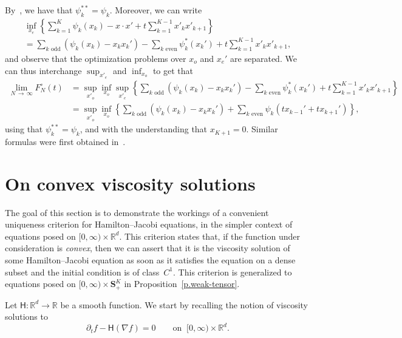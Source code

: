 \documentclass[AHL,Unicode,longabstracts,published]{cedram}
\newcommand{\R}{\mathbb{R}}
\renewcommand{\S}{\mathbf{S}}
\newcommand{\Ll}{\left}
\newcommand{\Rr}{\right}
\newcommand{\dr}{\partial}
\newcommand{\msf}{\mathsf}
\begin{document}
By~\cite[Theorem~12.4]{rockafellar1970convex}, we have that $\psi_k^{**} = \psi_k$. Moreover, we can write
\begin{multline*}
\inf_{x_e} \Ll\{ \sum_{k = 1}^K \psi_k(x_k) - x \cdot x' + t \sum_{k = 1}^{K-1} x'_k x'_{k+1}\Rr\} \\
= \sum_{k \text{ odd}} \Ll(\psi_k(x_k) -x_k x_k'\Rr) - \sum_{k \text{ even}} \psi^*_k(x_k') + t \sum_{k = 1}^{K-1} x'_k x'_{k+1},
\end{multline*}
and observe that the optimization problems over $x_o$ and $x_e'$ are separated. We can thus interchange $\sup_{x'_e}$ and $\inf_{x_o}$ to get that
\begin{align*}
\lim_{N\,\to\,\infty} F_N^\circ(t) & = \sup_{x'_o} \inf_{x_o} \sup_{x'_e} \Ll\{ \sum_{k \text{ odd}} \Ll(\psi_k(x_k) -x_k x_k'\Rr) - \sum_{k \text{ even}} \psi_k^*\Ll(x_k'\Rr) + t \sum_{k = 1}^{K-1} x'_k x'_{k+1} \Rr\}
\\
& = \sup_{x'_o} \inf_{x_o} \Ll\{\sum_{k \text{ odd}} \Ll(\psi_k(x_k)- x_k x_k'\Rr) + \sum_{k \text{ even}} \psi_k\Ll(t x_{k-1}' + t x_{k+1}'\Rr)\Rr\},
\end{align*}
using that $\psi_k^{**} = \psi_k$, and with the understanding that $x_{K+1} = 0$. Similar formulas were first obtained in~\cite{accm}.



\appendix

\section{On convex viscosity solutions}\label{a.vis}

The goal of this section is to demonstrate the workings of a convenient uniqueness criterion for Hamilton--Jacobi equations, in the simpler context of equations posed on $[0,\infty) \times \R^d$. This criterion states that, if the function under consideration is \emph{convex}, then we can assert that it is the viscosity solution of some Hamilton--Jacobi equation as soon as it satisfies the equation on a dense subset and the initial condition is of class~$C^1$. This criterion is generalized to equations posed on $[0,\infty) \times \S^K_+$ in Proposition~\ref{p.weak-tensor}.


Let $\msf H: \R^d \to \R$ be a smooth function. We start by recalling the notion of viscosity solutions to
\begin{equation}\label{e.hj}
\dr_t f - \msf H(\nabla f) = 0 \qquad \text{on } \ [0,\infty) \times \R^d.
\end{equation}
\end{document}
